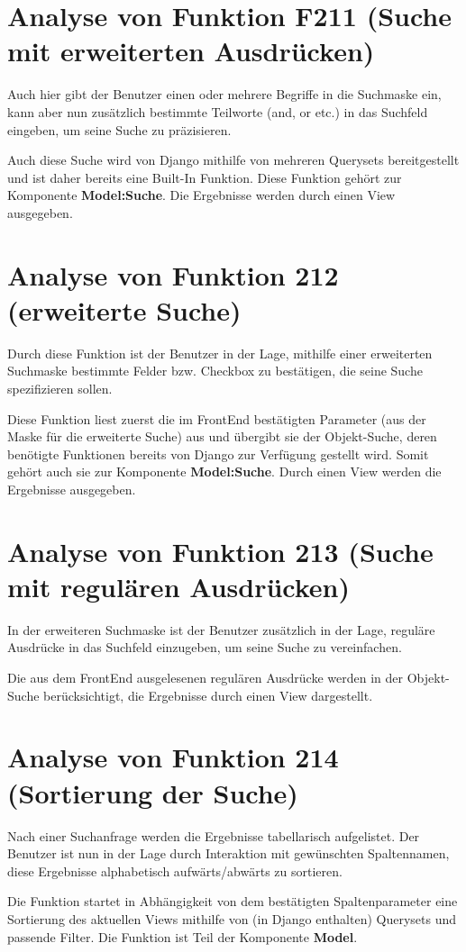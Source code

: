 \section{Analyse von Funktion F211 (Suche mit erweiterten Ausdrücken)}
Auch hier gibt der Benutzer einen oder mehrere Begriffe in die Suchmaske ein, kann aber nun zusätzlich bestimmte Teilworte (and, or etc.) in das Suchfeld eingeben, um seine Suche zu präzisieren.  

Auch diese Suche wird von Django mithilfe von mehreren Querysets bereitgestellt und ist daher bereits eine Built-In Funktion. Diese Funktion gehört zur Komponente \textbf{Model:Suche}. 
Die Ergebnisse werden durch einen View ausgegeben. 

\section{Analyse von Funktion 212 (erweiterte Suche)}
Durch diese Funktion ist der Benutzer in der Lage, mithilfe einer erweiterten Suchmaske bestimmte Felder bzw. Checkbox zu bestätigen, die seine Suche spezifizieren sollen.
    
Diese Funktion liest zuerst die im FrontEnd bestätigten Parameter (aus der Maske für die erweiterte Suche) aus und übergibt sie der Objekt-Suche, deren benötigte Funktionen bereits von Django zur Verfügung gestellt wird. Somit gehört auch sie zur Komponente \textbf{Model:Suche}. Durch einen View werden die Ergebnisse ausgegeben.  

\section{Analyse von Funktion 213 (Suche mit regulären Ausdrücken)}
In der erweiteren Suchmaske ist der Benutzer zusätzlich in der Lage, reguläre Ausdrücke in das Suchfeld einzugeben, um seine Suche zu vereinfachen. 

Die aus dem FrontEnd ausgelesenen regulären Ausdrücke werden in der Objekt-Suche berücksichtigt, die Ergebnisse durch einen View dargestellt.
 
\section{Analyse von Funktion 214 (Sortierung der Suche)}
Nach einer Suchanfrage werden die Ergebnisse tabellarisch aufgelistet. Der Benutzer ist nun in der Lage durch Interaktion mit gewünschten Spaltennamen, diese Ergebnisse alphabetisch aufwärts/abwärts zu sortieren. 

Die Funktion startet in Abhängigkeit von dem bestätigten Spaltenparameter eine Sortierung des aktuellen Views mithilfe von (in Django enthalten) Querysets und passende Filter. Die Funktion ist Teil der Komponente \textbf{Model}. 




 